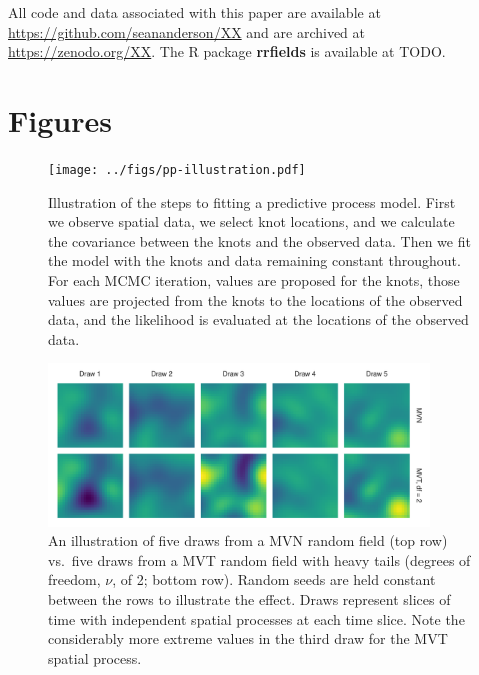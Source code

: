 \documentclass[12pt,english]{article}
\begin{document}
\begin{spacing}{1.5}
All code and data associated with this paper are available at
\url{https://github.com/seananderson/XX} and are archived at
\url{https://zenodo.org/XX}.
The R package \textbf{rrfields} is available at TODO.

\section{Figures}

\begin{figure}[htb]
\begin{center}
  \texttt{[image: ../figs/pp-illustration.pdf]}
\caption{
Illustration of the steps to fitting a predictive process model.
First we observe spatial data, we select knot locations,
and we calculate the covariance between the knots and the observed data.
Then we fit the model with the knots and data remaining constant throughout.
For each MCMC iteration, values are proposed for the
knots, those values are projected from the knots to the locations of the observed data,
and the likelihood is evaluated at the locations of the observed data.}
\label{fig:didactic}
\end{center}
\end{figure}

\clearpage

\begin{figure}[htb]
\begin{center}
  \includegraphics[width=0.9\textwidth]{../figs/nu-rf-illustration.pdf}
\caption{An illustration of five draws from a MVN random field (top row)
vs.\ five draws from a MVT random field with heavy tails
(degrees of freedom, $\nu$, of 2; bottom row). Random seeds are held constant
between the rows
to illustrate the effect. Draws represent slices of time with independent spatial
processes at each time slice. Note the considerably more extreme values in
the third draw for the MVT spatial process.}
\label{fig:nu}
\end{center}
\end{figure}


\end{spacing}
\end{document}
